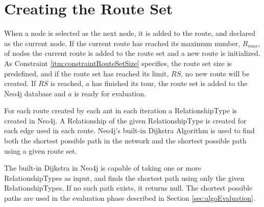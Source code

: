 \section{Creating the Route Set}
\label{sec:algoCreatingRouteSet}

When a node is selected as the next node, it is added to the route, and declared as the current node. If the current route has reached its maximum number, $R_{max}$, of nodes the current route is added to the route set and a new route is initialized. As Constraint \vref{itm:constraintRouteSetSize} specifies, the route set size is predefined, and if the route set has reached its limit, $RS$, no new route will be created. If $RS$ is reached, $a$ has finished its tour, the route set is added to the Neo4j database and $a$ is ready for evaluation. 

For each route created by each ant in each iteration a RelationshipType is created in Neo4j. A Relationship of the given RelationshipType is created for each edge used in each route. Neo4j's built-in Dijkstra Algorithm is used to find both the shortest possible path in the network and the shortest possible path using a given route set. 

The built-in Dijkstra in Neo4j is capable of taking one or more RelationshipTypes as input, and finds the shortest path using only the given RelationshipTypes. If no such path exists, it returns null. The shortest possible paths are used in the evaluation phase described in Section \vref{sec:algoEvaluation}.